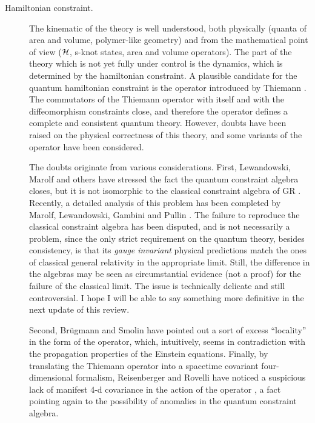 \documentclass[12pt]{article}
\begin{document}
\begin{description}

\item[Hamiltonian constraint.] 

The kinematic of the theory is well understood, both physically 
(quanta of area and volume, polymer-like geometry) and from the 
mathematical point of view ($\cal H$, s-knot states, area and 
volume operators).  The part of the theory which is not yet fully 
under control is the dynamics, which is determined by the 
hamiltonian constraint.  A plausible candidate for the quantum 
hamiltonian constraint is the operator introduced by Thiemann 
\cite{Thiemann96,Thiemann96b,Thiemann96c}.  The commutators of 
the Thiemann operator with itself and with the diffeomorphism 
constraints close, and therefore the operator defines a complete 
and consistent quantum theory.  However, doubts have been raised 
on the physical correctness of this theory, and some variants of 
the operator have been considered.

The doubts originate from various considerations.  First, Lewandowski, 
Marolf and others have stressed the fact the quantum constraint 
algebra closes, but it is not isomorphic to the classical constraint 
algebra of GR \cite{LewandowskiMarolf}.  Recently, a detailed analysis 
of this problem has been completed by Marolf, Lewandowski, Gambini and 
Pullin \cite{LewandowskiEtAl}.  The failure to reproduce the classical 
constraint algebra has been disputed, and is not necessarily a 
problem, since the only strict requirement on the quantum theory, 
besides consistency, is that its {\em gauge invariant\/} physical 
predictions match the ones of classical general relativity in the 
appropriate limit.  Still, the difference in the algebras may be seen as 
circumstantial evidence (not a proof) for the failure of the classical 
limit.  The issue is technically delicate and still 
controversial.  I hope I will be able to say something more 
definitive in the next update of this review. 

Second, Br\"ugmann \cite{Bruegmann3} and Smolin \cite{Smolin96} 
have pointed out a sort of excess ``locality'' in the form of the 
operator, which, intuitively, seems in contradiction with the 
propagation properties of the Einstein equations.  Finally, by 
translating the Thiemann operator into a spacetime covariant 
four-dimensional formalism, Reisenberger and Rovelli have noticed 
a suspicious lack of manifest 4-d covariance in the action of the 
operator \cite{ReisenbergerRovelli}, a fact pointing again to the 
possibility of anomalies in the quantum constraint algebra.


\end{description}
\end{document}
